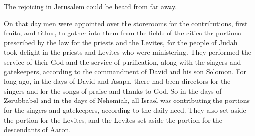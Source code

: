 {The rejoicing
in Jerusalem
could be heard
from far away.
\par }{\PP {}On that day
men
were appointed
over
the storerooms
for the contributions,
first fruits,
and tithes,
to gather
into them from the fields
of the cities
the portions prescribed
by the law
for the priests
and the Levites,
for
the people of Judah
took delight
in
the priests
and Levites
who
were ministering.
They performed
the service
of their God
and the service
of purification,
along with the singers
and gatekeepers,
according to the commandment
of David
and his son
Solomon.
For
long ago,
in the days
of David
and Asaph,
there
had been directors
for the singers
and for the songs
of praise
and thanks
to God.
So in the days
of Zerubbabel
and in the days
of Nehemiah,
all
Israel
was contributing
the portions
for the singers
and gatekeepers,
according to the daily
need.
They also set aside the portion
for the Levites,
and the Levites
set aside the portion
for the descendants
of Aaron.

}
